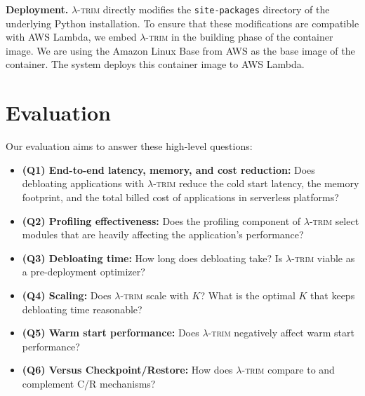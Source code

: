 \documentclass[sigplan,nonacm]{acmart}
\newenvironment{vinlist}
{\begin{itemize}[leftmargin=1.5em]
  \setlength{\itemsep}{0pt}
  \setlength{\labelwidth}{0.75em}
\setlength{\parsep}{0pt}
\setlength{\topsep}{0pt}
  \setlength{\partopsep}{0pt}
  }
{\end{itemize}}
\newcommand{\sys}{\textsc{\ensuremath{\lambda}-trim}\xspace}
\newcommand{\heading}[1]{\vspace{4pt}\noindent\textbf{#1.}}
\begin{document}
\heading{Deployment} \sys directly modifies the \texttt{site-packages} directory of the underlying Python installation.
To ensure that these modifications are compatible with AWS Lambda, we embed \sys in the building phase of the container image.
We are using the Amazon Linux Base from AWS as the base image of the container.
The system deploys this container image to AWS Lambda.
 
\section{Evaluation}





Our evaluation aims to answer these high-level questions:
\begin{vinlist}

\item \textbf{(Q1) End-to-end latency, memory, and cost reduction:} Does debloating applications with \sys reduce the cold start latency, the memory footprint, and the total billed cost of applications in serverless platforms?

\item \textbf{(Q2) Profiling effectiveness:} Does the profiling component of \sys select modules that are heavily affecting the application's performance?

\item \textbf{(Q3) Debloating time:} How long does debloating take? 
Is \sys viable as a pre-deployment optimizer? 

\item \textbf{(Q4) Scaling:} Does \sys scale with $K$?
What is the optimal $K$ that keeps debloating time reasonable?

\item \textbf{(Q5) Warm start performance:} Does \sys negatively affect warm start performance?

\item \textbf{(Q6) Versus Checkpoint/Restore:} How does \sys compare to and complement C/R mechanisms? 


\end{vinlist}
\end{document}
